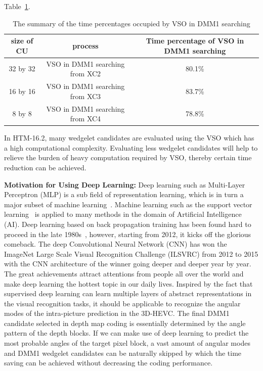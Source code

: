 Table~\ref{tab:vso-in-dmm1-searching-time-percent-summary}.
\begin{table}[t]
    \caption{The summary of the time percentages occupied by VSO in DMM1 searching}
    \bigskip\label{tab:vso-in-dmm1-searching-time-percent-summary}
    \centering
    \begin{tabular}{c c c}
        \toprule
        size of CU & process & Time percentage of VSO in DMM1 searching\\
        \midrule
        32 by 32  & VSO in DMM1 searching from XC2 & 80.1\% \\
        16 by 16 & VSO in DMM1 searching from XC3 & 83.7\% \\
        8 by 8 & VSO in DMM1 searching from XC4 & 78.8\% \\
        \bottomrule
    \end{tabular}
\end{table}
In HTM-16.2, many wedgelet candidates are evaluated using the VSO which
has a high computational complexity.
Evaluating less wedgelet candidates will help to relieve
the burden of heavy computation required by VSO, thereby certain
time reduction can be achieved.

\textbf{Motivation for Using Deep Learning:} Deep learning such as
Multi-Layer Perceptron (MLP) is a sub field of representation learning, which
is in turn a major subset of machine learning~\parencite{RN158}.
Machine learning such as the support vector learning~\parencite{RN198}
is applied to many methods in the domain of Artificial Intelligence (AI).
Deep learning based on back propagation training has been found hard to proceed
in the late 1980s~\parencite{RN199}, however, starting from 2012, it kicks off the
glorious comeback.
The deep Convolutional Neural Network (CNN) has won the ImageNet
Large Scale Visual Recognition Challenge (ILSVRC)
from 2012 to 2015 with the CNN architecture of the winner going deeper
and deeper year by year.
The great achievements attract attentions from people all over the world and
make deep learning the hottest topic in our daily lives.
Inspired by the fact that supervised deep learning can learn multiple layers of
abstract representations in the visual recognition tasks, it should
be applicable to recognize the angular modes of the intra-picture
prediction in the 3D-HEVC\@.
The final DMM1 candidate selected in depth map coding
is essentially determined by the angle pattern of the depth blocks.
If we can make use of deep learning to predict the most probable angles of the
target pixel block, a vast amount of angular modes and DMM1
wedgelet candidates can be naturally skipped by which the time saving can be
achieved without decreasing the coding performance.

